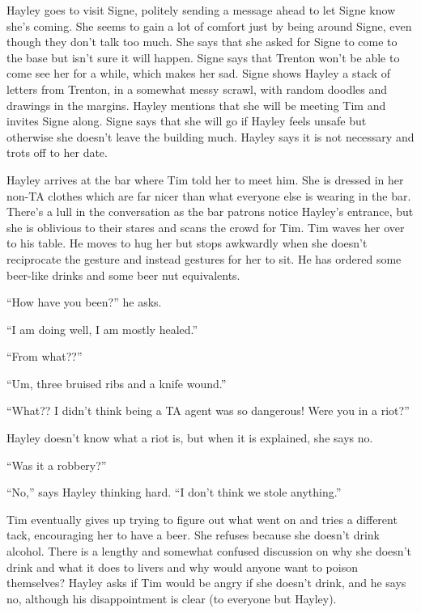 
Hayley goes to visit Signe, politely sending a message ahead to let Signe know she's coming.  She seems to gain a lot of comfort just by being around Signe, even though they don't talk too much.  She says that she asked for Signe to come to the base but isn't sure it will happen.  Signe says that Trenton won't be able to come see her for a while, which makes her sad.  Signe shows Hayley a stack of letters from Trenton, in a somewhat messy scrawl, with random doodles and drawings in the margins.  Hayley mentions that she will be meeting Tim and invites Signe along.  Signe says that she will go if Hayley feels unsafe but otherwise she doesn't leave the building much.  Hayley says it is not necessary and trots off to her date.



Hayley arrives at the bar where Tim told her to meet him.  She is dressed in her non-TA clothes which are far nicer than what everyone else is wearing in the bar.  There's a lull in the conversation as the bar patrons notice Hayley's entrance, but she is oblivious to their stares and scans the crowd for Tim.  Tim waves her over to his table.  He moves to hug her but stops awkwardly when she doesn't reciprocate the gesture and instead gestures for her to sit.  He has ordered some beer-like drinks and some beer nut equivalents.

``How have you been?'' he asks.

``I am doing well, I am mostly healed.''

``From what??''

``Um, three bruised ribs and a knife wound.''

``What??  I didn't think being a TA agent was so dangerous!  Were you in a riot?''

Hayley doesn't know what a riot is, but when it is explained, she says no.

``Was it a robbery?''

``No,'' says Hayley thinking hard.  ``I don't think we stole anything.''

Tim eventually gives up trying to figure out what went on and tries a different tack, encouraging her to have a beer.   She refuses because she doesn't drink alcohol.  There is a lengthy and somewhat confused discussion on why she doesn't drink and what it does to livers and why would anyone want to poison themselves?  Hayley asks if Tim would be angry if she doesn't drink, and he says no, although his disappointment is clear (to everyone but Hayley).  



